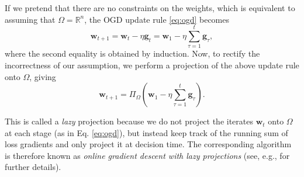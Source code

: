 If we pretend that there are no constraints on the weights, which is equivalent to assuming that $\Omega = \mathbb{R}^n$, the OGD update rule \eqref{eq:ogd} becomes
\begin{equation}
\label{eq:unprojected-lazy-ogd}
	\mathbf{w}_{t+1}
	= \mathbf{w}_t - \eta\mathbf{g}_t
	= \mathbf{w}_1 - \eta\sum_{\tau=1}^{t} \mathbf{g}_\tau,
\end{equation}
where the second equality is obtained by induction. Now, to rectify the incorrectness of our assumption, we perform a projection of the above update rule onto $\Omega$, giving
\begin{equation}
\label{eq:lazy-ogd}
	\mathbf{w}_{t+1}
	= \Pi_{\Omega}\left(\mathbf{w}_1 - \eta\sum_{\tau=1}^{t} \mathbf{g}_\tau\right).
\end{equation}
\begin{mccorrection}
This is called a \emph{lazy} projection because we do not project the iterates $\mathbf{w}_t$ onto $\Omega$ at each stage (as in Eq. \eqref{eq:ogd}), but instead keep track of the running sum of loss gradients and only project it at decision time. The corresponding algorithm is therefore known as \emph{online gradient descent with lazy projections} (see, e.g., \citep{shalev-shwartz11} for further details).
\end{mccorrection}

